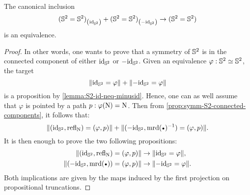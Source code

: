 \documentclass[english,a4paper]{lmcs}
\begin{document}
\begin{prop}
  The canonical inclusion
  \begin{displaymath}
    {({{\mathbb S^{2}}}= {{\mathbb S^{2}}})}_{\left(\mathord{\mathrm{id}}_{{\mathbb S^{2}}}\right)} + {({{\mathbb S^{2}}} = {{\mathbb S^{2}}})}_{\left(-\mathord{\mathrm{id}}_{{\mathbb S^{2}}}\right)} \to ({{\mathbb S^{2}}} = {{\mathbb S^{2}}})
  \end{displaymath}
  is an equivalence.
  \label{prop:symm-S2-connected-components}
\end{prop}
\begin{proof}
  In other words, one wants to prove that a symmetry of ${{\mathbb S^{2}}}$ is in the
  connected component of either $\mathord{\mathrm{id}}_{{\mathbb S^{2}}}$ or $-\mathord{\mathrm{id}}_{{\mathbb S^{2}}}$. Given an equivalence
  $\varphi:{{\mathbb S^{2}}} \simeq {{\mathbb S^{2}}}$, the target
  \begin{displaymath}
    \lVert\mathord{\mathrm{id}}_{{\mathbb S^{2}}} = \varphi\rVert + \lVert-\mathord{\mathrm{id}}_{{\mathbb S^{2}}} = \varphi\rVert
  \end{displaymath}
  is a proposition by \cref{lemma:S2-id-neq-minusid}. Hence, one can as well
  assume that $\varphi$ is pointed by a path $p:\varphi(\mathrm{N}) = \mathrm{N}$. Then from
  \cref{prop:symm-S2-connected-components}, it follows that:
  \begin{displaymath}
    \Trunc{(\id_\Sp,\refl\north) = (\varphi, p)} + \Trunc{(-\id_\Sp,\inv{\mrd(\base)}) = (\varphi, p)}.
  \end{displaymath}
  It is then enough to prove the two following propositions:
  \begin{align*}
    \Trunc{(\id_\Sp,\refl\north) = (\varphi, p)} &\to \Trunc{\id_\Sp = \varphi},
    \\
    \Trunc{(-\id_\Sp,\mrd(\base)) = (\varphi, p)} &\to \Trunc{-\id_\Sp = \varphi}.
  \end{align*}
  Both implications are given by the maps induced by the first projection on
  propositional truncations.
\end{proof}
\end{document}
